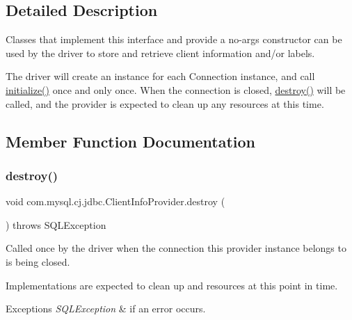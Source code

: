 \subsection{Detailed Description}
Classes that implement this interface and provide a no-\/args constructor can be used by the driver to store and retrieve client information and/or labels.

The driver will create an instance for each Connection instance, and call \mbox{\hyperlink{interfacecom_1_1mysql_1_1cj_1_1jdbc_1_1_client_info_provider_aacf1104fd90e2c5b1ca940d63e884cf6}{initialize()}} once and only once. When the connection is closed, \mbox{\hyperlink{interfacecom_1_1mysql_1_1cj_1_1jdbc_1_1_client_info_provider_a994581557bab4982ec5699fa1114ef5a}{destroy()}} will be called, and the provider is expected to clean up any resources at this time. 

\subsection{Member Function Documentation}
\mbox{\label{interfacecom_1_1mysql_1_1cj_1_1jdbc_1_1_client_info_provider_a994581557bab4982ec5699fa1114ef5a}} 
\subsubsection{\texorpdfstring{destroy()}{destroy()}}
{\footnotesize\ttfamily void com.\+mysql.\+cj.\+jdbc.\+Client\+Info\+Provider.\+destroy (\begin{DoxyParamCaption}{ }\end{DoxyParamCaption}) throws S\+Q\+L\+Exception}

Called once by the driver when the connection this provider instance belongs to is being closed.

Implementations are expected to clean up and resources at this point in time.


\begin{DoxyExceptions}{Exceptions}
{\em S\+Q\+L\+Exception} & if an error occurs. \\
\hline
\end{DoxyExceptions}


